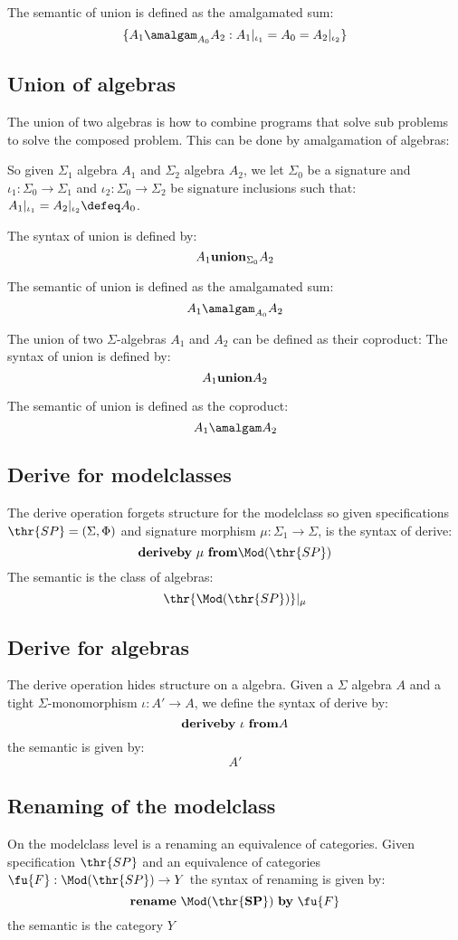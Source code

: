 The semantic of union is defined as the amalgamated sum:
	\[ \{ A_1 \amalgam_{A_0} A_2 : A_1|_{\iota_1} = A_0 = A_2|_{\iota_2} \} \] 



\subsection{Union of algebras}
The union of two algebras is how to combine programs that solve sub problems to solve the composed problem. This can be done by amalgamation of algebras:

So given $\Sigma_1$ algebra $A_1$ and $\Sigma_2$ algebra $A_2$, we let $\Sigma_0$ be a signature and $\iota_1:\Sigma_0 \to \Sigma_1$ and $\iota_2:\Sigma_0 \to \Sigma_2$ be signature inclusions such that: $A_1|_{\iota_1} = A_2|_{\iota_2} \defeq A_0$.

The syntax of union is defined by:
	\[  A_1 {\bf union}_{\Sigma_0} A_2 \]

The semantic of union is defined as the amalgamated sum:
	\[ A_1 \amalgam_{A_0} A_2 \] 


The union of two $\Sigma$-algebras $A_1$ and $A_2$ can be defined as their coproduct:
The syntax of union is defined by:
	\[  A_1 {\bf union} A_2 \]

The semantic of union is defined as the coproduct:
	\[ A_1 \amalgam A_2 \] 


\subsection{Derive for modelclasses}
The derive operation forgets structure for the modelclass so given specifications $\thr{SP}=(\Sigma,\Phi)$ and signature morphism $\mu: \Sigma_1 \to \Sigma$, is the syntax of derive: 
	\[ {\bf{ derive by \ \mu \ from}} \Mod(\thr{SP}) \]
The semantic is the class of algebras:
	\[ \thr{\Mod(\thr{SP})}|_\mu \]
		
\subsection{Derive for algebras}
The derive operation hides structure on a algebra.
Given a $\Sigma$ algebra $A$ and a tight $\Sigma$-monomorphism $\iota:A' \to A$, we define the syntax of derive by:
	\[ {\bf{ derive by\ \iota \ from}} A \]
the semantic is given by:
	\[ A' \]

\subsection{Renaming of the modelclass}
On the modelclass level is a renaming an equivalence of categories.
Given specification $\thr{SP}$ and an equivalence of categories $\fu{F}:\Mod(\thr{SP}) \to Y$ the syntax of renaming is given by:
	\[ {\bf{ rename\ \Mod(\thr{SP}) \ by}} \ \fu{F} \]
the semantic is the category $Y$

